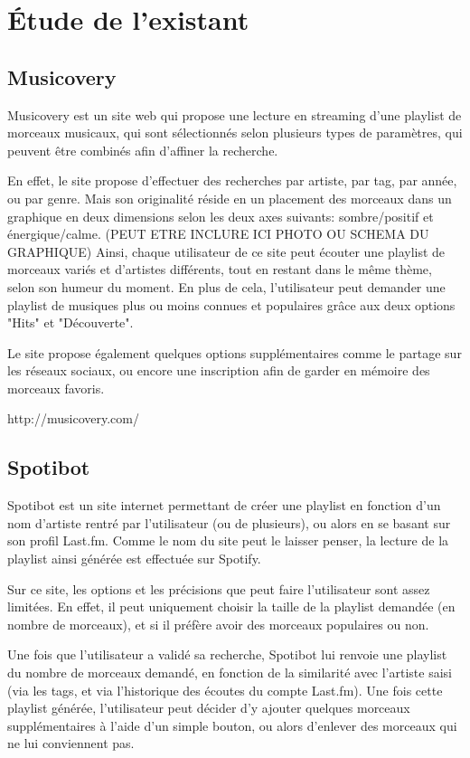 
\section{Étude de l'existant}

\subsection{Musicovery}

Musicovery est un site web qui propose une lecture en streaming d'une 
playlist de morceaux musicaux, qui sont sélectionnés selon plusieurs types 
de paramètres, qui peuvent être combinés afin d'affiner la recherche.

En effet, le site propose d'effectuer des recherches par artiste, par tag, 
par année, ou par genre. Mais son originalité réside en un placement des 
morceaux dans un graphique en deux dimensions selon les deux axes suivants:
sombre/positif et énergique/calme. (PEUT ETRE INCLURE ICI PHOTO OU SCHEMA DU GRAPHIQUE)
Ainsi, chaque utilisateur de ce site peut écouter une playlist de morceaux 
variés et d'artistes différents, tout en restant dans le même thème, selon 
son humeur du moment.
En plus de cela, l'utilisateur peut demander une playlist de musiques plus 
ou moins connues et populaires grâce aux deux options "Hits" et "Découverte".

Le site propose également quelques options supplémentaires comme le partage 
sur les réseaux sociaux, ou encore une inscription afin de garder en mémoire 
des morceaux favoris.

http://musicovery.com/

\subsection{Spotibot}

Spotibot est un site internet permettant de créer une playlist en fonction 
d'un nom d'artiste rentré par l'utilisateur (ou de plusieurs), ou alors en 
se basant sur son profil Last.fm. Comme le nom du site peut le laisser 
penser, la lecture de la playlist ainsi générée est effectuée sur Spotify.

Sur ce site, les options et les précisions que peut faire l'utilisateur sont 
assez limitées. En effet, il peut uniquement choisir la taille de la 
playlist demandée (en nombre de morceaux), et si il préfère avoir des 
morceaux populaires ou non.

Une fois que l'utilisateur a validé sa recherche, Spotibot lui renvoie une 
playlist du nombre de morceaux demandé, en fonction de la similarité avec 
l'artiste saisi (via les tags, et via l'historique des écoutes du compte 
Last.fm). Une fois cette playlist générée, l'utilisateur peut décider d'y 
ajouter quelques morceaux supplémentaires à l'aide d'un simple bouton, ou 
alors d'enlever des morceaux qui ne lui conviennent pas.


